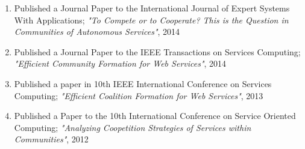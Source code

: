     \begin{enumerate}        
        \item Published a Journal Paper to the International Journal of Expert Systems With Applications; \emph{"To Compete or to Cooperate? This is the Question in Communities of Autonomous Services"}, 2014
        \item Published a Journal Paper to the IEEE Transactions on Services Computing; \emph{"Efficient Community Formation for Web Services"}, 2014        
        \item Published a paper in 10th IEEE International Conference on Services Computing; \emph{"Efficient Coalition Formation for Web Services"}, 2013
        \item Published a Paper to the 10th International Conference on Service Oriented Computing; \emph{"Analyzing Coopetition Strategies of Services within Communities"}, 2012        
    \end{enumerate}
    
